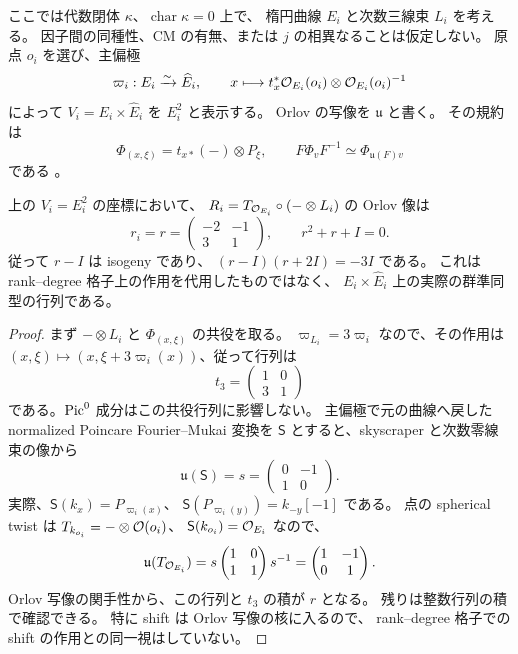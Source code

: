 ここでは代数閉体 $\kappa$、$\operatorname{char}\kappa=0$ 上で、
楕円曲線 $E_i$ と次数三線束 $L_i$ を考える。
因子間の同種性、CM の有無、または $j$ の相異なることは仮定しない。
原点 $o_i$ を選び、主偏極
\[
 \varpi_i:E_i\xrightarrow{\sim}\widehat E_i,\qquad
 x\longmapsto t_x^*\mathcal O_{E_i}(o_i)\otimes\mathcal O_{E_i}(o_i)^{-1}
\]
によって $V_i=E_i\times\widehat E_i$ を $E_i^2$ と表示する。
Orlov の写像を $\mathfrak u$ と書く。
その規約は
\[
 \Phi_{(x,\xi)}=t_{x*}(-)\otimes P_\xi,\qquad
 F\Phi_vF^{-1}\simeq\Phi_{\mathfrak u(F)v}
\]
である \cite[equation~(2.1), Corollary~2.13,
Propositions~2.15, 3.3]{MBFCOrlovAbelian}。

\begin{lemma}
\label{mbfc:lem:orlov-rotation}
上の $V_i=E_i^2$ の座標において、
$R_i=T_{\mathcal O_{E_i}}\circ(-\otimes L_i)$ の Orlov 像は
\[
 r_i=r=
 \begin{pmatrix}-2&-1\\3&1\end{pmatrix},\qquad
 r^2+r+I=0.
\]
従って $r-I$ は isogeny であり、
$(r-I)(r+2I)=-3I$ である。
これは rank--degree 格子上の作用を代用したものではなく、
$E_i\times\widehat E_i$ 上の実際の群準同型の行列である。
\end{lemma}
\begin{proof}
まず $-\otimes L_i$ と $\Phi_{(x,\xi)}$ の共役を取る。
$\varpi_{L_i}=3\varpi_i$ なので、その作用は
$(x,\xi)\mapsto(x,\xi+3\varpi_i(x))$、従って行列は
\[
 t_3=\begin{pmatrix}1&0\\3&1\end{pmatrix}
\]
である。$\operatorname{Pic}^0$ 成分はこの共役行列に影響しない。
主偏極で元の曲線へ戻した normalized Poincare Fourier--Mukai 変換を
$\mathsf S$ とすると、skyscraper と次数零線束の像から
\[
 \mathfrak u(\mathsf S)=
   s=\begin{pmatrix}0&-1\\1&0\end{pmatrix}.
\]
実際、$\mathsf S(k_x)=P_{\varpi_i(x)}$、
$\mathsf S(P_{\varpi_i(y)})=k_{-y}[-1]$ である。
点の spherical twist は $T_{k_{o_i}}=-\otimes\mathcal O(o_i)$、
$\mathsf S(k_{o_i})=\mathcal O_{E_i}$ なので、
\[
 \mathfrak u(T_{\mathcal O_{E_i}})
   =s\begin{pmatrix}1&0\\1&1\end{pmatrix}s^{-1}
   =\begin{pmatrix}1&-1\\0&1\end{pmatrix}.
\]
Orlov 写像の関手性から、この行列と $t_3$ の積が $r$ となる。
残りは整数行列の積で確認できる。
特に shift は Orlov 写像の核に入るので、
rank--degree 格子での shift の作用との同一視はしていない。
\end{proof}

